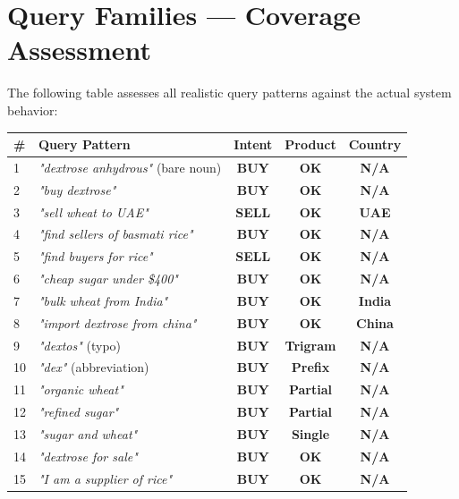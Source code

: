 \documentclass[12pt,a4paper]{article}
\newcommand{\cellOK}[1]{\cellcolor{okBg}\textcolor{zaraiGreen}{\textbf{#1}}}
\newcommand{\cellWarn}[1]{\cellcolor{warningBg}\textcolor{zaraiAmber}{\textbf{#1}}}
\newcommand{\cellBad}[1]{\cellcolor{errorBg}\textcolor{zaraiRed}{\textbf{#1}}}
\begin{document}
\section{Query Families --- Coverage Assessment}

The following table assesses all realistic query patterns against the actual system behavior:

\begin{longtable}{lp{5cm}ccc}
\toprule
\textbf{\#} & \textbf{Query Pattern} & \textbf{Intent} & \textbf{Product} & \textbf{Country} \\
\midrule
\endhead
1 & \textit{"dextrose anhydrous"} (bare noun) & \cellOK{BUY} & \cellOK{OK} & \cellOK{N/A} \\
2 & \textit{"buy dextrose"} & \cellOK{BUY} & \cellOK{OK} & \cellOK{N/A} \\
3 & \textit{"sell wheat to UAE"} & \cellOK{SELL} & \cellOK{OK} & \cellOK{UAE} \\
4 & \textit{"find sellers of basmati rice"} & \cellOK{BUY} & \cellOK{OK} & \cellOK{N/A} \\
5 & \textit{"find buyers for rice"} & \cellOK{SELL} & \cellOK{OK} & \cellOK{N/A} \\
6 & \textit{"cheap sugar under \$400"} & \cellOK{BUY} & \cellOK{OK} & \cellOK{N/A} \\
7 & \textit{"bulk wheat from India"} & \cellOK{BUY} & \cellOK{OK} & \cellOK{India} \\
8 & \textit{"import dextrose from china"} & \cellOK{BUY} & \cellOK{OK} & \cellOK{China} \\
9 & \textit{"dextos"} (typo) & \cellOK{BUY} & \cellOK{Trigram} & \cellOK{N/A} \\
10 & \textit{"dex"} (abbreviation) & \cellOK{BUY} & \cellOK{Prefix} & \cellOK{N/A} \\
11 & \textit{"organic wheat"} & \cellOK{BUY} & \cellWarn{Partial} & \cellOK{N/A} \\
12 & \textit{"refined sugar"} & \cellOK{BUY} & \cellWarn{Partial} & \cellOK{N/A} \\
13 & \textit{"sugar and wheat"} & \cellOK{BUY} & \cellBad{Single} & \cellOK{N/A} \\
14 & \textit{"dextrose for sale"} & \cellBad{BUY} & \cellOK{OK} & \cellOK{N/A} \\
15 & \textit{"I am a supplier of rice"} & \cellBad{BUY} & \cellOK{OK} & \cellOK{N/A} \\

\end{longtable}
\end{document}
